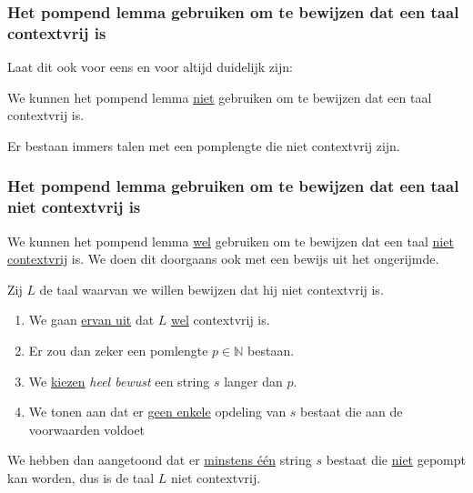 \documentclass[main.tex]{subfiles}
\begin{document}
\subsubsection{Het pompend lemma gebruiken om te bewijzen dat een taal contextvrij is}
Laat dit ook voor eens en voor altijd duidelijk zijn:
\begin{center}
  We kunnen het pompend lemma \underline{niet} gebruiken om te bewijzen dat een taal contextvrij is.
\end{center}
Er bestaan immers talen met een pomplengte die niet contextvrij zijn.

\subsubsection{Het pompend lemma gebruiken om te bewijzen dat een taal niet contextvrij is}
We kunnen het pompend lemma \underline{wel} gebruiken om te bewijzen dat een taal \underline{niet contextvrij} is.
We doen dit doorgaans ook met een bewijs uit het ongerijmde.

Zij $L$ de taal waarvan we willen bewijzen dat hij niet contextvrij is.
\begin{enumerate}
\item We gaan \underline{ervan uit} dat $L$ \underline{wel} contextvrij is.
\item Er zou dan zeker een pomlengte $p\in \mathbb{N}$ bestaan.
\item We \underline{kiezen} \emph{heel bewust} een string $s$ langer dan $p$.
\item We tonen aan dat er \underline{geen enkele} opdeling van $s$ bestaat die aan de voorwaarden voldoet
\end{enumerate}
We hebben dan aangetoond dat er \underline{minstens \'e\'en} string $s$ bestaat die \underline{niet} gepompt kan worden, dus is de taal $L$ niet contextvrij.
\end{document}

